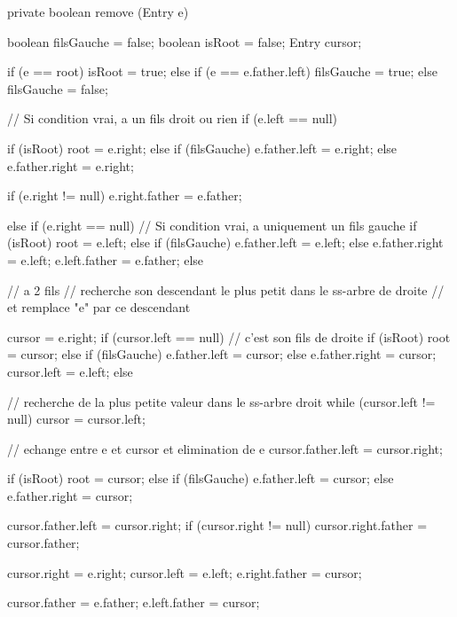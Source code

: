 \begin{hide}
\begin{code}
\begin{hide}
   private boolean remove (Entry e) {
      boolean filsGauche = false;
      boolean isRoot = false;
      Entry cursor;

      if (e == root)
         isRoot = true;
      else {
         if (e == e.father.left)
            filsGauche = true;
         else
            filsGauche = false;
      }

      // Si condition vrai, a un fils droit ou rien
      if (e.left == null) {
         if (isRoot)
            root = e.right;
         else if (filsGauche)
            e.father.left = e.right;
         else
            e.father.right = e.right;

         if (e.right != null)
            e.right.father = e.father;
      }
      else if (e.right == null) {
         // Si condition vrai,  a uniquement un fils gauche
         if (isRoot)
            root = e.left;
         else if (filsGauche)
            e.father.left = e.left;
         else
            e.father.right = e.left;
         e.left.father = e.father;
      }
      else {
         // a 2 fils
         // recherche son descendant le plus petit dans le ss-arbre de droite
         // et remplace "e" par ce descendant

         cursor = e.right;
         if (cursor.left == null) {
            // c'est son fils de droite
            if (isRoot)
               root = cursor;
            else {
               if (filsGauche)
                  e.father.left = cursor;
               else
                  e.father.right = cursor;
            }
            cursor.left = e.left;
         }
         else {
            // recherche de la plus petite valeur dans le ss-arbre droit
            while (cursor.left != null)
               cursor = cursor.left;

            // echange entre e et cursor et elimination de e
            cursor.father.left = cursor.right;

            if (isRoot)
               root = cursor;
            else if (filsGauche)
               e.father.left = cursor;
            else
               e.father.right = cursor;

            cursor.father.left = cursor.right;
            if (cursor.right != null)
               cursor.right.father = cursor.father;

            cursor.right = e.right;
            cursor.left  = e.left;
            e.right.father = cursor;
         }

         cursor.father = e.father;
         e.left.father = cursor;
      }

}
\end{hide}
\end{code}
\end{hide}
